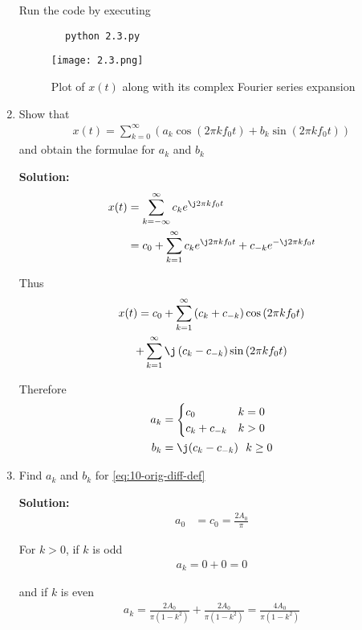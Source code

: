 \documentclass[journal,12pt,twocolumn]{IEEEtran}
\newcommand{\solution}{\noindent \textbf{Solution: }}
\providecommand{\brak}[1]{\ensuremath{\left(#1\right)}}
\numberwithin{equation}{section}
\numberwithin{figure}{section}
\renewcommand\thesection{\arabic{section}}
\begin{document}
\begin{enumerate}[label=\thesection.\arabic*,ref=\thesection.\theenumi]
	Run the code by executing
	\begin{lstlisting}
		python 2.3.py
	\end{lstlisting}

	\begin{figure}[!ht]
		\centering
		\texttt{[image: 2.3.png]}
		\caption{Plot of $x(t)$ along with its complex Fourier series expansion}
		\label{fig-2.3}	
	\end{figure}
	
	\item Show that 
	\begin{align}
		x(t) = \sum_{k = 0}^{\infty}\brak{a_k\cos{\brak{2\pi kf_0 t}}+b_k\sin{\brak{2\pi kf_0 t}}}
		\label{eq:one-Z-real}
	\end{align}
	and obtain the formulae for $a_k$ and $b_k$	
	
	\solution
	\begin{align}
    		x(t) &= \sum_{k = -\infty}^{\infty}c_ke^{\j2\pi kf_0 t} \\
        &= c_0 + \sum_{k = 1}^{\infty}c_ke^{\j2\pi kf_0t} + c_{-k}e^{-\j2\pi kf_0t} 
	\end{align}
	
	Thus
	\begin{multline}
		x(t) = c_0 + \sum_{k = 1}^{\infty}\brak{c_k + c_{-k}}\cos\brak{2\pi kf_0t}   \\
        + \sum_{k = 1}^{\infty}\j\brak{c_k - c_{-k}}\sin\brak{2\pi kf_0t}
	\end{multline}
	
	Therefore
	\begin{align}
    		a_k &= 
	    \begin{cases}
	        c_0 & k = 0 \\
    		    c_k + c_{-k} & k > 0
	    \end{cases} \\
    		b_k &= \j(c_k - c_{-k}) ~~ k \ge 0
	\end{align}	
	
	\item Find $a_k$ and $b_k$ for \eqref{eq:10-orig-diff-def}
	
	\solution 
	\begin{align}
		a_0 &= c_0 = \frac{2A_0}{\pi} 
	\end{align}
	
	For $k > 0$, if $k$ is odd
	\begin{align}
		a_k = 0 + 0 = 0
	\end{align}
	
	and if $k$ is even
	\begin{align}
		a_k = \frac{2A_0}{\pi(1-k^2)} + \frac{2A_0}{\pi(1-k^2)} = \frac{4A_0}{\pi(1-k^2)}
	\end{align}
	

\end{enumerate}
\end{document}
